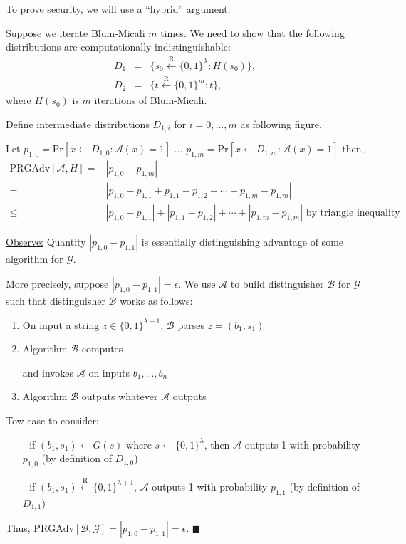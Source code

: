 \documentclass{article}
\begin{document}
To prove security, we will use a \underline{``hybrid'' argument}.

Suppose we iterate Blum-Micali $m$ times. We need to show that the following distributions are computationally indistinguishable:
\begin{eqnarray*}
    D_1 &=& \{ s_0 \overset{\mathrm{R}}{\leftarrow} \{ 0,1 \}^{\lambda}: H(s_0) \}, \nonumber \\
    D_2 &=& \{ t \overset{\mathrm{R}}{\leftarrow} \{ 0,1 \}^{m}: t \}, \nonumber 
\end{eqnarray*}
where $H(s_0)$ is $m$ iterations of Blum-Micali.

Define intermediate distributions $D_{1,i}$ for $i=0,...,m$ as following figure.

Let $p_{1,0} = \mathrm{Pr}[x\leftarrow D_{1,0}:\mathcal{A}(x)=1]$ ... $p_{1,m} = \mathrm{Pr}[x\leftarrow D_{1,m}:\mathcal{A}(x)=1]$ then,
\begin{align*} 
    \mathrm{PRGAdv}[\mathcal{A},H] =& \left| p_{1,0}-p_{1,m} \right| 
    \\
    =& \left| p_{1,0}-p_{1,1} + p_{1,1}-p_{1,2} + \cdots + p_{1,m}-p_{1,m} \right|
    \\
    \leq& \left| p_{1,0}-p_{1,1} \right| + \left| p_{1,1}-p_{1,2} \right| + \cdots + \left| p_{1,m}-p_{1,m} \right| \text{  by triangle inequality}
\end{align*}

\underline{Observe:} Quantity $\left| p_{1,0}-p_{1,1} \right|$ is essentially distinguishing advantage of some algorithm for $\mathcal{G}$.



More precisely, suppose $\left| p_{1,0} - p_{1,1} \right| = \epsilon$. We use $\mathcal{A}$ to build distinguisher $\mathcal{B}$ for $\mathcal{G}$ such that distinguisher $\mathcal{B}$ works as follows: 
\begin{enumerate}
    \item On input a string $z \in \{ 0,1 \}^{\lambda+1}$, $\mathcal{B}$ parses $z = (b_1, s_1)$
    \item Algorithm $\mathcal{B}$ computes
    
    and invokes $\mathcal{A}$ on inputs $b_1,...,b_n$
    \item Algorithm $\mathcal{B}$ outputs whatever $\mathcal{A}$ outputs
\end{enumerate}

Tow case to consider:
\begin{enumerate}
    \item[-] if $(b_1,s_1) \leftarrow G(s)$ where $s \leftarrow \{ 0,1 \}^{\lambda}$, then $\mathcal{A}$ outputs 1 with probability $p_{1,0}$ (by definition of $D_{1,0}$)
    \item[-] if $(b_1,s_1) \overset{\mathrm{R}}{\leftarrow} \{ 0,1 \}^{\lambda+1}$, $\mathcal{A}$ outputs 1 with probability $p_{1,1}$ (by definition of $D_{1,1}$)
\end{enumerate}
Thus, $\mathrm{PRGAdv}[\mathcal{B},\mathcal{G}] = \left| p_{1,0} - p_{1,1} \right| = \epsilon$. \qquad $ \blacksquare$ 
\\
\end{document}
